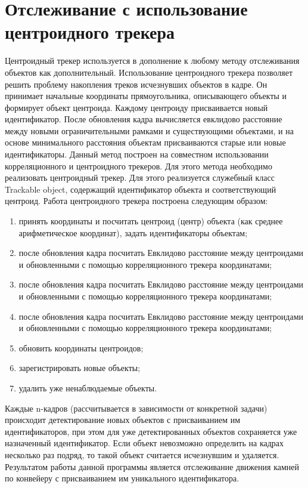 \documentclass[times]{itmo-student-thesis}
\begin{document}
\section{Отслеживание с использование центроидного трекера}
Центроидный трекер  используется в дополнение к любому методу отслеживания объектов как дополнительный. Использование центроидного трекера позволяет решить проблему накопления треков исчезнувших объектов в кадре.
 Он принимает начальные координаты прямоугольника, описывающего объекты и формирует объект центроида. Каждому центроиду присваивается новый идентификатор. После обновления кадра вычисляется евклидово расстояние между новыми ограничительными рамками и существующими объектами, и на основе минимального расстояния объектам присваиваются старые или новые идентификаторы.
Данный метод построен на совместном использовании корреляционного и центроидного трекеров.
Для этого метода необходимо реализовать центроидный трекер. Для этого реализуется служебный класс Trackable object, содержащий идентификатор объекта и соответствующий центроид.
Работа центроидного трекера построена следующим образом:
\begin{enumerate}
	\item принять координаты и посчитать центроид (центр) объекта (как среднее арифметическое координат), задать идентификаторы объектам;
	\item после обновления кадра посчитать Евклидово расстояние между центроидами и обновленными с помощью  корреляционного трекера координатами;
	\item после обновления кадра посчитать Евклидово расстояние между центроидами и обновленными с помощью  корреляционного трекера координатами;
	\item после обновления кадра посчитать Евклидово расстояние между центроидами и обновленными с помощью  корреляционного трекера координатами;
	\item обновить координаты центроидов;
	\item зарегистрировать новые объекты;
	\item удалить уже ненаблюдаемые объекты.
\end{enumerate}

Каждые n-кадров (рассчитывается в зависимости от конкретной задачи) происходит детектирование новых объектов с присваиванием им идентификаторов, при этом для уже детектированных объектов сохраняется уже назначенный идентификатор.  Если объект невозможно определить на кадрах несколько раз подряд, то такой объект считается исчезнувшим и удаляется.
Результатом работы данной программы является отслеживание движения камней по конвейеру с присваиванием им уникального идентификатора.
\end{document}
